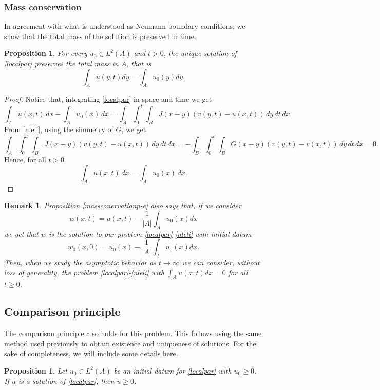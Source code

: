\documentclass[reqno]{amsart}
\numberwithin{equation}{section}
\newtheorem{proposition}[theorem]{Proposition}
\newtheorem{remark}[theorem]{Remark}
\begin{document}
\subsubsection{Mass conservation}

In agreement with what is understood as Neumann boundary conditions,
we show that the total mass of the solution is preserved in time.

\begin{proposition}\label{massconervationp-e} For every $u_0\in {L^2(A)}$ and $t>0$, the unique solution of \eqref{localpar} preserves the total mass in $A$, that is
$$\int_A u(y,t)dy=\int_A u_0(y)dy.$$
\end{proposition}


\begin{proof}
  Notice that, integrating \eqref{localpar} in space and time we get
   $$
    \int_A u(x,t)\, dx-\int_Au_0(x)\, dx=\int_A\int_{0}^{t}\int_B J(x-y)(v(y,t)-u(x,t))\, dy \, dt \, dx .
$$
From \eqref{nleli}, using the simmetry of $G$, we get 
$$\int_A\int_{0}^{t}\int_B J(x-y)(v(y,t)-u(x,t))\,  dy \, dt \, dx=-\int_B \int_{0}^{t}\int_B G(x-y)(v(y,t)-v(x,t))
\, dy\, dt\, dx = 0.$$
Hence, for all $t>0$ 
$$\int_A u(x,t)\, dx=\int_Au_0(x)\, dx.$$
\end{proof}

\begin{remark} {\rm Proposition \eqref{massconervationp-e} also says that, if we consider $$w(x,t)=u(x,t)-\displaystyle\frac{1}{|A|}\int_A u_0(x)dx$$ we get that $w$ is the solution to our problem \eqref{localpar}-\eqref{nleli} with initial datum $$w_0(x,0)=u_0(x)-\displaystyle \frac{1}{|A|}\int_A u_0(x)dx. $$ Then, when we study the asymptotic behavior
as $t\to \infty$ we can consider, without loss of generality, the problem \eqref{localpar}-\eqref{nleli} with $\int_A u(x,t)dx=0$ for all $t\geq 0$. }
\end{remark}

\subsection{Comparison principle}

The comparison principle also holds for this problem. 
This follows using the same method used previously to obtain existence and uniqueness 
of solutions. For the sake of completeness, we will include some details here.

\begin{proposition}\label{comparison1} Let $u_0\in L^2(A)$ be an initial datum for \eqref{localpar} with $u_0\geq 0$. If $u$ is a solution of \eqref{localpar}, then $u\geq 0$.
\end{proposition}
\end{document}
